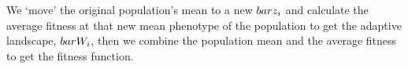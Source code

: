 \setmainfont{texgyreadventor}
\fontsize{12}{15}
\selectfont
{}
\begin{minipage}{3.5in}
We `move' the original population's mean to a new $\\bar z_i$ 
and calculate the average fitness at that new mean phenotype 
of the population to get the adaptive landscape, $\\bar W_i$, 
then we combine the population mean and the average fitness 
to get the \textcolor{Rred}{fitness function}.
\end{minipage}
